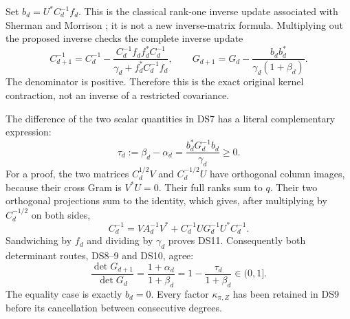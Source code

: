 Set \(b_d=U^*C_d^{-1}f_d\). This is the classical rank-one inverse
update associated with Sherman and Morrison \cite{dsroot:SM}; it is not a new
inverse-matrix formula. Multiplying out the proposed inverse
checks the complete inverse update
\begin{equation}\label{dsroot:eq:inverseupdate}
C_{d+1}^{-1}=C_d^{-1}
-\frac{C_d^{-1}f_df_d^*C_d^{-1}}
{\gamma_d+f_d^*C_d^{-1}f_d},\qquad
G_{d+1}=G_d-\frac{b_db_d^*}{\gamma_d(1+\beta_d)}.
\tag{DS10}
\end{equation}
The denominator is positive. Therefore this is the exact original
kernel contraction, not an inverse of a restricted covariance.

The difference of the two scalar quantities in DS7 has a literal
complementary expression:
\begin{equation}\label{dsroot:eq:gap}
\boxed{\tau_d:=\beta_d-\alpha_d
=\frac{b_d^*G_d^{-1}b_d}{\gamma_d}\geq0.}
\tag{DS11}
\end{equation}
For a proof, the two matrices \(C_d^{1/2}V\) and \(C_d^{-1/2}U\)
have orthogonal column images, because their cross Gram is \(V^*U=0\).
Their full ranks sum to \(q\). Their two orthogonal projections sum
to the identity, which gives, after multiplying by \(C_d^{-1/2}\)
on both sides,
\[
C_d^{-1}=VA_d^{-1}V^*
+C_d^{-1}UG_d^{-1}U^*C_d^{-1}.
\]
Sandwiching by \(f_d\) and dividing by \(\gamma_d\) proves DS11.
Consequently both determinant routes, DS8--9 and DS10, agree:
\begin{equation}\label{dsroot:eq:kernelstep}
\boxed{\frac{\det G_{d+1}}{\det G_d}
=\frac{1+\alpha_d}{1+\beta_d}
=1-\frac{\tau_d}{1+\beta_d}\in(0,1].}
\tag{DS12}
\end{equation}
The equality case is exactly \(b_d=0\). Every factor
\(\kappa_{\pi,Z}\) has been retained in DS9 before its cancellation
between consecutive degrees.

